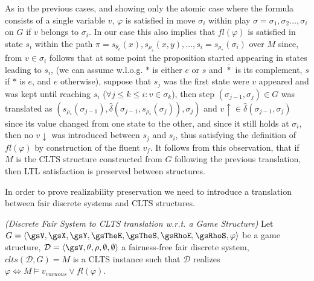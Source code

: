 As in the previous cases, and showing only the atomic case where the formula consists of a single variable $v$, $\varphi$ is satisfied in move $\sigma_i$ within play $\sigma=\sigma_1,\sigma_2\ldots ,\sigma_i$ on $G$ if $v$ belongs to $\sigma_i$. In our case this also implies that $fl(\varphi)$ is satisfied in state $s_i$ within the path $\pi=s_{\theta_e}(x),s_{\rho_s}(x,y),\ldots,s_i=s_{\rho_*}(\sigma_i)$ over $M$ since, from $v \in \sigma_i$ follows that at some point the proposition started appearing in states leading to $s_i$, (we can assume w.l.o.g. $*$ is either $e$ or $s$ and $\overline{*}$ is its complement, $s$ if $*$ is $e$, and $e$ otherwise), suppose that $s_j$ was the first state were $v$ appeared and was kept until reaching $s_i$ ($\forall j \leq k \leq i: v \in \sigma_k$), then step $(\sigma_{j-1},\sigma_j) \in G$ was translated as $(s_{\rho_*}(\sigma_{j-1}), \hat{\delta}(\sigma_{j-1},s_{\rho_{\overline{*}}}(\sigma_j)),\sigma_{j})$ and $v\uparrow \in \hat{\delta}(\sigma_{j-1},\sigma_j)$ since its value changed from one state to the other, and since it still holds at $\sigma_i$, then no $v\downarrow$ was introduced between $s_j$ and $s_i$, thus satisfying the definition of $fl(\varphi)$ by construction of the fluent $v_f$. It follows from this observation, that if $M$ is the CLTS structure constructed from $G$ following the previous translation, then LTL satisfaction is preserved between structures.

In order to prove realizability preservation we need to introduce a translation between fair discrete systems and CLTS structures. 

\begin{definition}
	\label{def:dfs_to_clts_translation} \emph{(Discrete Fair System to CLTS translation w.r.t. a Game Structure)} 
	Let $G =  \langle \gsV, \gsX, \gsY, \gsTheE, \gsTheS, \gsRhoE, \gsRhoS, \varphi \rangle$ be a game structure, $\mathcal{D}=\langle \gsV, \theta, \rho, \emptyset, \emptyset \rangle$ a fairness-free fair discrete system, $clts(\mathcal{D},G)=M$ is a CLTS instance such that $\mathcal{D}$ realizes $\varphi \iff M \models v_{vacuous} \vee fl(\varphi)$.
\end{definition}

